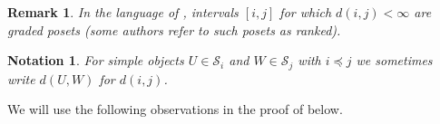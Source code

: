 \documentclass[11pt]{article}
\theoremstyle{plain}
\theoremstyle{nonumberplain}
\theoremstyle{plain}
\newtheorem{notation}[lemma]{Notation}
\newtheorem{remark}[lemma]{Remark}
\theoremstyle{nonumberplain}
\newcommand\bT{\mathbb T}
\newcommand\cS{\mathcal S}
\DeclareMathOperator{\soc}{\mathrm{soc}}
\begin{document}
\begin{remark}\label{re.rank}  
  In the language of \cite[Section 3.1]{ec1}, intervals $[i,j]$ for which
  $d(i,j)<\infty$ are {\it graded} posets (some authors refer to
  such posets as {\it ranked}).
\end{remark}



\begin{notation}\label{not.def-obj}
  For simple objects $U\in \cS_i$ and $W\in \cS_j$ with $i\preceq j$
  we sometimes write $d(U,W)$ for
  $d(i,j)$.
\end{notation}





We will use the following observations in the proof of 
{below}.
\end{document}

